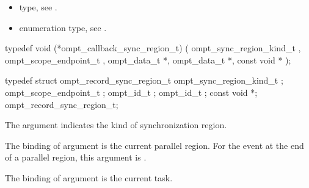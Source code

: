 \crossreferences
\begin{itemize}
\item {} type, see
.
\item {} enumeration type, see
.
\end{itemize}



\label{sec:ompt_callback_sync_region_t}
\format

\begin{ccppspecific}
\begin{omptCallback}
typedef void (*ompt_callback_sync_region_t) (
  ompt_sync_region_kind_t ,
  ompt_scope_endpoint_t ,
  ompt_data_t *,
  ompt_data_t *,
  const void *
);
\end{omptCallback}
\end{ccppspecific}


\record

\begin{ccppspecific}
\begin{omptRecord}
typedef struct ompt_record_sync_region_t {
  ompt_sync_region_kind_t ;
  ompt_scope_endpoint_t ;
  ompt_id_t ;
  ompt_id_t ;
  const void *;
} ompt_record_sync_region_t;
\end{omptRecord}
\end{ccppspecific}



\argdesc

The argument  indicates the kind of
synchronization region.

\epdesc

The binding of argument  is the current
parallel region.
For the  event at the end of a parallel region, 
this argument is .

The binding of argument  is the current task.

\codeptrdesc

